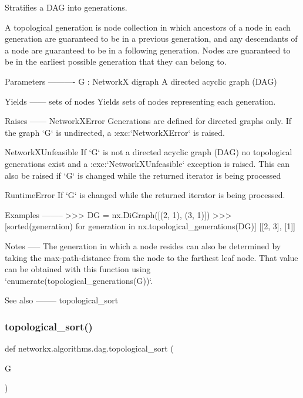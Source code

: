 \begin{DoxyVerb}Stratifies a DAG into generations.

A topological generation is node collection in which ancestors of a node in each
generation are guaranteed to be in a previous generation, and any descendants of
a node are guaranteed to be in a following generation. Nodes are guaranteed to
be in the earliest possible generation that they can belong to.

Parameters
----------
G : NetworkX digraph
    A directed acyclic graph (DAG)

Yields
------
sets of nodes
    Yields sets of nodes representing each generation.

Raises
------
NetworkXError
    Generations are defined for directed graphs only. If the graph
    `G` is undirected, a :exc:`NetworkXError` is raised.

NetworkXUnfeasible
    If `G` is not a directed acyclic graph (DAG) no topological generations
    exist and a :exc:`NetworkXUnfeasible` exception is raised.  This can also
    be raised if `G` is changed while the returned iterator is being processed

RuntimeError
    If `G` is changed while the returned iterator is being processed.

Examples
--------
>>> DG = nx.DiGraph([(2, 1), (3, 1)])
>>> [sorted(generation) for generation in nx.topological_generations(DG)]
[[2, 3], [1]]

Notes
-----
The generation in which a node resides can also be determined by taking the
max-path-distance from the node to the farthest leaf node. That value can
be obtained with this function using `enumerate(topological_generations(G))`.

See also
--------
topological_sort
\end{DoxyVerb}
 \mbox{\label{namespacenetworkx_1_1algorithms_1_1dag_ab21f66ba4608c33f0e992f552694bd6d}} 
\subsubsection{\texorpdfstring{topological\+\_\+sort()}{topological\_sort()}}
{\footnotesize\ttfamily def networkx.\+algorithms.\+dag.\+topological\+\_\+sort (\begin{DoxyParamCaption}\item[{}]{G }\end{DoxyParamCaption})}

